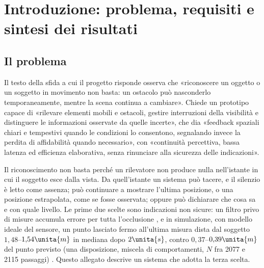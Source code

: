\section{Introduzione: problema, requisiti e sintesi dei risultati}\label{sec:intro}

\subsection{Il problema}\label{sec:intro-problema}

Il testo della sfida a cui il progetto risponde osserva che «riconoscere un oggetto o un soggetto in movimento non basta: un ostacolo può nasconderlo temporaneamente, mentre la scena continua a cambiare». Chiede un prototipo capace di «rilevare elementi mobili e ostacoli, gestire interruzioni della visibilità e distinguere le informazioni osservate da quelle incerte», che dia «feedback spaziali chiari e tempestivi quando le condizioni lo consentono, segnalando invece la perdita di affidabilità quando necessario», con «continuità percettiva, bassa latenza ed efficienza elaborativa, senza rinunciare alla sicurezza delle indicazioni».

Il riconoscimento non basta perché un rilevatore non produce nulla nell'istante in cui il soggetto esce dalla vista. Da quell'istante un sistema può tacere, e il silenzio è letto come assenza; può continuare a mostrare l'ultima posizione, o una posizione estrapolata, come se fosse osservata; oppure può dichiarare che cosa sa e con quale livello. Le prime due scelte sono indicazioni non sicure: un filtro privo di misure accumula errore per tutta l'occlusione \cite{cao2023}, e in simulazione, con modello ideale del sensore, un punto lasciato fermo all'ultima misura dista dal soggetto $1{,}48$--$1{,}54\unita{m}$ in mediana dopo $2\unita{s}$, contro $0{,}37$--$0{,}39\unita{m}$ del punto previsto (una disposizione, miscela di comportamenti, $N$ fra 2077 e 2115 passaggi) . Questo allegato descrive un sistema che adotta la terza scelta.

